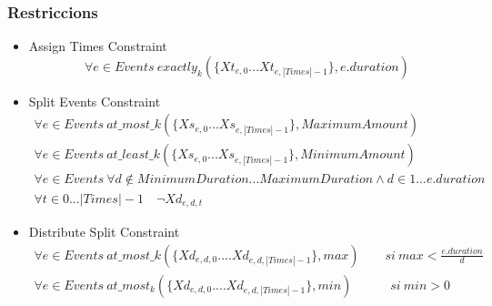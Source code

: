\documentclass[11pt]{beamer}
\begin{document}
  
  \begin{frame}
    \frametitle{Restriccions}

    \begin{itemize}
      \item Assign Times Constraint \[
        \forall e \in Events \ exactly_k(\{Xt_{e,0} ... Xt_{e,|Times|-1}\}, e.duration)
      \]
      \item Split Events Constraint
      \begin{gather*}
        \forall e \in Events \ at\_most\_k(\{Xs_{e,0} . . . Xs_{e,|Times|-1}\}, MaximumAmount)\\
        \forall e \in Events \ at\_least\_k(\{Xs_{e,0} . . . Xs_{e,|Times|-1}\}, MinimumAmount)\\
        \forall e \in Events \ \forall d \notin MinimumDuration...MaximumDuration \land d \in 1 ... e.duration  \\
        \forall t \in 0...|Times|-1 \quad \neg Xd_{e,d,t}
      \end{gather*}
      \item Distribute Split Constraint
      \begin{gather*}
      \forall e \in Events \ at\_most\_k(\{Xd_{e,d,0} .... Xd_{e,d,|Times|-1}\}, max) \quad \quad si \ max<\frac{e.duration}{d}\\
      \forall e \in Events \ at\_most_k(\{Xd_{e,d,0} .... Xd_{e,d,|Times|-1}\}, min) \quad \quad \quad si \ min>0\\
      \end{gather*}
    \end{itemize}
  
  \end{frame} 
\end{document}
